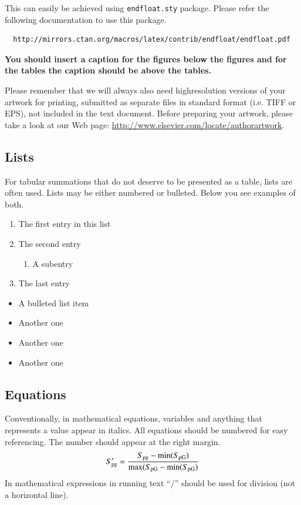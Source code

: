 \documentclass[times,onecolumn,final,longtitle]{elsarticle}
\begin{document}
This can easily be achieved using \verb+endfloat.sty+ package. Please
refer the following documentation to use this package.
\begin{verbatim}
  http://mirrors.ctan.org/macros/latex/contrib/endfloat/endfloat.pdf
\end{verbatim}

\textcolor{newcolor}{\bf You should insert a caption for the figures
  below the figures and for the tables the caption should be above the
  tables.}

Please remember that we will always also need highresolution versions
of your artwork for printing, submitted as separate files in standard
format (i.e. TIFF or EPS), not included in the text document. Before
preparing your artwork, please take a look at our Web page:
\url{http://www.elsevier.com/locate/authorartwork}.


\subsection{Lists}

For tabular summations that do not deserve to be presented as
a table, lists are often used. Lists may be either numbered or
bulleted. Below you see examples of both.
\begin{enumerate}
  \item The first entry in this list
  \item The second entry
        \begin{enumerate}
          \item A subentry
        \end{enumerate}
  \item The last entry
\end{enumerate}
\begin{itemize}
  \item A bulleted list item
  \item Another one
  \item Another one
  \item Another one
\end{itemize}

\subsection{Equations}
Conventionally, in mathematical equations, variables and
anything that represents a value appear in italics.
All equations should be numbered for easy referencing. The number
should appear at the right margin.
\begin{equation}
  S_{\rm pg}'=\frac{S_{\rm pg}-\min(S_{\rm pG})}
  {\max(S_{\rm pG}-\min(S_{\rm pG})}
\end{equation}
In mathematical expressions in running text ``/'' should be used for
division (not a horizontal line).
\end{document}
